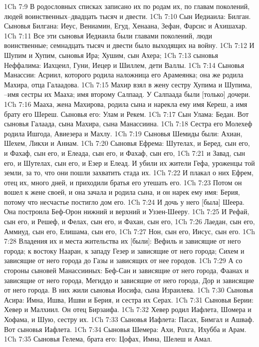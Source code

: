1Ch 7:9  В родословных списках записано их по родам их, по главам поколений, людей воинственных--двадцать тысяч и двести.
1Ch 7:10  Сын Иедиаила: Билган. Сыновья Билгана: Иеус, Вениамин, Егуд, Хенаана, Зефан, Фарсис и Ахишахар.
1Ch 7:11  Все эти сыновья Иедиаила были главами поколений, люди воинственные; семнадцать тысяч и двести было выходящих на войну.
1Ch 7:12  И Шупим и Хупим, сыновья Ира; Хушим, сын Ахера;
1Ch 7:13  сыновья Неффалима: Иахцеил, Гуни, Иецер и Шиллем, дети Валлы.
1Ch 7:14  Сыновья Манассии: Асриил, которого родила наложница его Арамеянка; она же родила Махира, отца Галаадова.
1Ch 7:15  Махир взял в жену сестру Хупима и Шупима, --имя сестры их Мааха; имя второму Салпаад. У Салпаада были [только] дочери.
1Ch 7:16  Мааха, жена Махирова, родила сына и нарекла ему имя Кереш, а имя брату его Шереш. Сыновья его: Улам и Рекем.
1Ch 7:17  Сын Улама: Бедан. Вот сыновья Галаада, сына Махира, сына Манассиина.
1Ch 7:18  Сестра его Молехеф родила Ишгода, Авиезера и Махлу.
1Ch 7:19  Сыновья Шемиды были: Ахиан, Шехем, Ликхи и Аниам.
1Ch 7:20  Сыновья Ефрема: Шутелах, и Беред, сын его, и Фахаф, сын его, и Елеада, сын его, и Фахаф, сын его,
1Ch 7:21  и Завад, сын его, и Шутелах, сын его, и Езер и Елеад. И убили их жители Гефа, уроженцы той земли, за то, что они пошли захватить стада их.
1Ch 7:22  И плакал о них Ефрем, отец их, много дней, и приходили братья его утешать его.
1Ch 7:23  Потом он вошел к жене своей, и она зачала и родила сына, и он нарек ему имя: Берия, потому что несчастье постигло дом его.
1Ch 7:24  И дочь у него [была] Шеера. Она построила Беф-Орон нижний и верхний и Уззен-Шееру.
1Ch 7:25  И Рефай, сын его, и Решеф, и Фелах, сын его, и Фахан, сын его,
1Ch 7:26  Лаедан, сын его, Аммиуд, сын его, Елишама, сын его,
1Ch 7:27  Нон, сын его, Иисус, сын его.
1Ch 7:28  Владения их и места жительства их [были]: Вефиль и зависящие от него города; к востоку Нааран, к западу Гезер и зависящие от него города; Сихем и зависящие от него города до Газы и зависящих от нее городов.
1Ch 7:29  А со стороны сыновей Манассииных: Беф-Сан и зависящие от него города, Фаанах и зависящие от него города, Мегиддо и зависящие от него города, Дор и зависящие от него города. В них жили сыновья Иосифа, сына Израилева.
1Ch 7:30  Сыновья Асира: Имна, Ишва, Ишви и Берия, и сестра их Серах.
1Ch 7:31  Сыновья Берии: Хевер и Малхиил. Он отец Бирзаифа.
1Ch 7:32  Хевер родил Иафлета, Шомера и Хофама, и Шую, сестру их.
1Ch 7:33  Сыновья Иафлета: Пасах, Бимгал и Ашваф. Вот сыновья Иафлета.
1Ch 7:34  Сыновья Шемера: Ахи, Рохга, Ихубба и Арам.
1Ch 7:35  Сыновья Гелема, брата его: Цофах, Имна, Шелеш и Амал.
